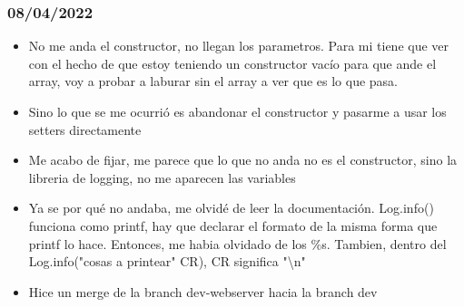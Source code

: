 \documentclass[../informe_krapp.tex]{subfiles}
\begin{document}
\subsubsection*{08/04/2022}
\begin{itemize}
	\item No me anda el constructor, no llegan los parametros.
	      Para mi tiene que ver con el hecho de que estoy teniendo un constructor vacío para
	      que ande el array, voy a probar a laburar sin el array a ver que es lo que pasa.
	\item Sino lo que se me ocurrió es abandonar el constructor y pasarme a
	      usar los setters directamente
	\item Me acabo de fijar, me parece que lo que no anda no es el constructor,
	      sino la libreria de logging, no me aparecen las variables
	\item Ya se por qué no andaba, me olvidé de leer la documentación.
	      Log.info() funciona como printf, hay que declarar el formato
	      de la misma forma que printf lo hace.
	      Entonces, me habia olvidado de los \%s.
	      Tambien, dentro del Log.info("cosas a printear" CR), CR significa "\textbackslash n"
	\item Hice un merge de la branch dev-webserver hacia la branch dev
\end{itemize}
\end{document}
